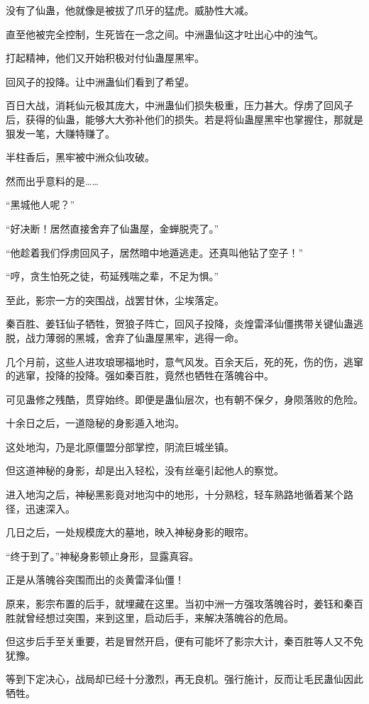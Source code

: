 \begin{this_body}
没有了仙蛊，他就像是被拔了爪牙的猛虎。威胁性大减。

直至他被完全控制，生死皆在一念之间。中洲蛊仙这才吐出心中的浊气。

打起精神，他们又开始积极对付仙蛊屋黑牢。

回风子的投降。让中洲蛊仙们看到了希望。

百日大战，消耗仙元极其庞大，中洲蛊仙们损失极重，压力甚大。俘虏了回风子后，获得的仙蛊，能够大大弥补他们的损失。若是将仙蛊屋黑牢也掌握住，那就是狠发一笔，大赚特赚了。

半柱香后，黑牢被中洲众仙攻破。

然而出乎意料的是……

“黑城他人呢？”

“好决断！居然直接舍弃了仙蛊屋，金蝉脱壳了。”

“他趁着我们俘虏回风子，居然暗中地遁逃走。还真叫他钻了空子！”

“哼，贪生怕死之徒，苟延残喘之辈，不足为惧。”

至此，影宗一方的突围战，战罢甘休，尘埃落定。

秦百胜、姜钰仙子牺牲，贺狼子阵亡，回风子投降，炎煌雷泽仙僵携带关键仙蛊逃脱，战力薄弱的黑城，舍弃了仙蛊屋黑牢，逃得一命。

几个月前，这些人进攻琅琊福地时，意气风发。百余天后，死的死，伤的伤，逃窜的逃窜，投降的投降。强如秦百胜，竟然也牺牲在落魄谷中。

可见蛊修之残酷，贯穿始终。即便是蛊仙层次，也有朝不保夕，身陨落败的危险。

十余日之后，一道隐秘的身影遁入地沟。

这处地沟，乃是北原僵盟分部掌控，阴流巨城坐镇。

但这道神秘的身影，却是出入轻松，没有丝毫引起他人的察觉。

进入地沟之后，神秘黑影竟对地沟中的地形，十分熟稔，轻车熟路地循着某个路径，迅速深入。

几日之后，一处规模庞大的墓地，映入神秘身影的眼帘。

“终于到了。”神秘身影顿止身形，显露真容。

正是从落魄谷突围而出的炎黄雷泽仙僵！

原来，影宗布置的后手，就埋藏在这里。当初中洲一方强攻落魄谷时，姜钰和秦百胜就曾经想过突围，来到这里，启动后手，来解决落魄谷的危局。

但这步后手至关重要，若是冒然开启，便有可能坏了影宗大计，秦百胜等人又不免犹豫。

等到下定决心，战局却已经十分激烈，再无良机。强行施计，反而让毛民蛊仙因此牺牲。


\end{this_body}
